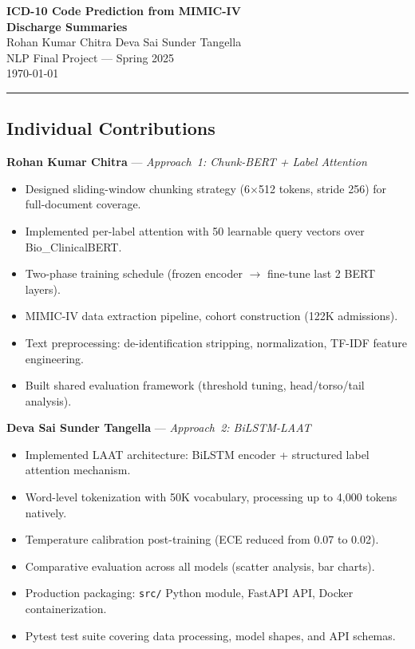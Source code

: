 \documentclass[11pt,a4paper]{article}
\begin{document}
\begin{center}
    {\LARGE\bfseries ICD-10 Code Prediction from MIMIC-IV\\[4pt] Discharge Summaries}\\[16pt]
    {\large Rohan Kumar Chitra \quad\quad Deva Sai Sunder Tangella}\\[8pt]
    {\normalsize NLP Final Project --- Spring 2025}\\[4pt]
    {\normalsize \today}
\end{center}

\vspace{6pt}
\noindent\rule{\textwidth}{0.5pt}

\subsection*{Individual Contributions}

\textbf{Rohan Kumar Chitra} --- \textit{Approach~1: Chunk-BERT + Label Attention}
\begin{itemize}[nosep,leftmargin=1.5em]
    \item Designed sliding-window chunking strategy (6$\times$512 tokens, stride 256) for full-document coverage.
    \item Implemented per-label attention with 50 learnable query vectors over Bio\_ClinicalBERT.
    \item Two-phase training schedule (frozen encoder $\rightarrow$ fine-tune last 2 BERT layers).
    \item MIMIC-IV data extraction pipeline, cohort construction (122K admissions).
    \item Text preprocessing: de-identification stripping, normalization, TF-IDF feature engineering.
    \item Built shared evaluation framework (threshold tuning, head/torso/tail analysis).
\end{itemize}

\textbf{Deva Sai Sunder Tangella} --- \textit{Approach~2: BiLSTM-LAAT}
\begin{itemize}[nosep,leftmargin=1.5em]
    \item Implemented LAAT architecture: BiLSTM encoder + structured label attention mechanism.
    \item Word-level tokenization with 50K vocabulary, processing up to 4,000 tokens natively.
    \item Temperature calibration post-training (ECE reduced from 0.07 to 0.02).
    \item Comparative evaluation across all models (scatter analysis, bar charts).
    \item Production packaging: \texttt{src/} Python module, FastAPI API, Docker containerization.
    \item Pytest test suite covering data processing, model shapes, and API schemas.
\end{itemize}
\end{document}
